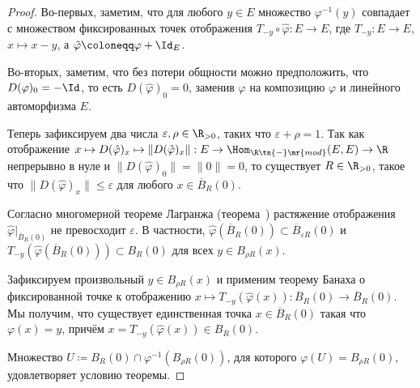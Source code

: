 \documentclass[
	extrafontsizes,
	11pt,
	hyphens,
]{memoir}
\begin{document}
\begin{proof}
Во-первых, заметим, что для любого \(y \in E\) множество \(\varphi^{-1}(y)\) совпадает с множеством фиксированных точек отображения \(T_{-y} \circ \hat{\varphi} : E \to E\), где \(T_{-y} : E \to E\), \(x \mapsto x - y\), а \(\hat{\varphi} \coloneqq \varphi + \Id_E\).

Во-вторых, заметим, что без потери общности можно предположить, что \(D(\varphi)_0 = -\Id\), то есть \(D(\hat{\varphi})_0 = 0\), заменив \(\varphi\) на композицию \(\varphi\) и линейного автоморфизма \(E\).

Теперь зафиксируем два числа
\(\varepsilon, \rho \in \R_{>0}\), таких что \(\varepsilon + \rho = 1\).
Так как отображение
\(x \mapsto D(\hat{\varphi})_x \mapsto \lVert D(\hat{\varphi})_x \rVert : E \to \Hom_{\R\tn{-}\mr{mod}}(E,E) \to \R\)
непрерывно в нуле
и \(\lVert D(\hat{\varphi})_0 \rVert = \lVert 0 \rVert = 0\),
то существует \(R \in \R_{>0}\), такое что
\(\lVert D(\hat{\varphi})_x \rVert \leq \varepsilon\)
для любого \(x \in \overline{B}_R(0)\).

Согласно многомерной теореме Лагранжа (теорема~)
растяжение отображения \(\hat{\varphi}|_{\overline{B}_R(0)}\)
не превосходит \(\varepsilon\).
В частности, \(\hat{\varphi}(\overline{B}_R(0)) \subset \overline{B}_{\varepsilon R}(0)\)
и \(T_{-y} (\hat{\varphi} (\overline{B}_R(0))) \subset B_R(0)\)
для всех \(y \in B_{\rho R}(x)\).

Зафиксируем произвольный \(y \in B_{\rho R}(x)\) и применим теорему Банаха о фиксированной точке к
отображению \(x \mapsto T_{-y}(\hat{\varphi}(x)) : \overline{B}_R(0) \to \overline{B}_R(0)\).
Мы получим, что существует единственная точка \(x \in \overline{B}_R(0)\) такая что \(\varphi(x) = y\),
причём \(x = T_{-y}(\hat{\varphi}(x)) \in B_R(0)\).

Множество
\(U \coloneqq B_R(0) \cap \varphi^{-1}(B_{\rho R}(0))\),
для которого \(\varphi(U) = B_{\rho R}(0)\),
удовлетворяет условию теоремы.
\end{proof}
\end{document}
